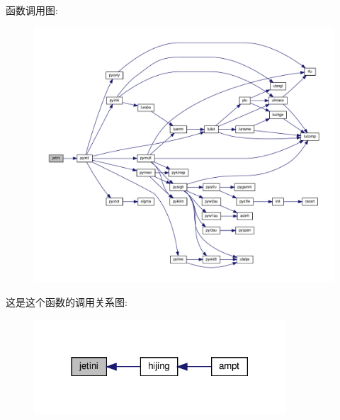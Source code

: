 函数调用图\+:
\nopagebreak
\begin{figure}[H]
\begin{center}
\leavevmode
\includegraphics[width=350pt]{jetini_8f90_aa55c39927d50ee6b6b1d03a82585ca78_cgraph}
\end{center}
\end{figure}
这是这个函数的调用关系图\+:
\nopagebreak
\begin{figure}[H]
\begin{center}
\leavevmode
\includegraphics[width=266pt]{jetini_8f90_aa55c39927d50ee6b6b1d03a82585ca78_icgraph}
\end{center}
\end{figure}
